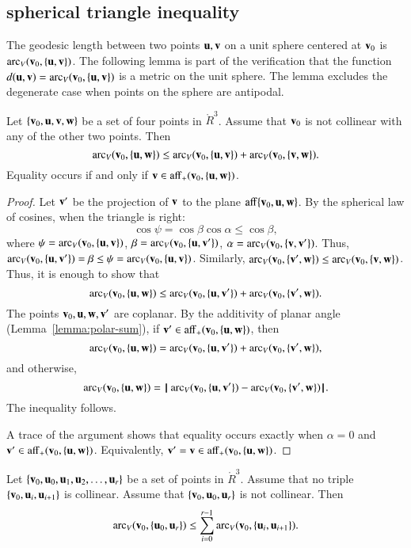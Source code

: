 \subsection{spherical triangle inequality}
%
%

The geodesic length between two points
$\u,\v$ on a unit sphere centered at $\v_0$ is $\arc_V(\v_0,\{\u,\v\})$.
The following lemma is part of the verification that
the function $d(\u,\v) = \arc_V(\v_0,\{\u,\v\})$ is a metric
on the unit sphere.  The lemma excludes the degenerate case when
points on the sphere are antipodal.
%

\begin{lemma}\label{lemma:sph-tri-ineq}
Let $\{\v_0,\u,\v,\w\}$ be a set of four points in $\ring{R}^3$.
Assume that $\v_0$ is not collinear with any of the other two points.
Then
   $$
   \arc_V(\v_0,\{\u,\w\}) \le \arc_V(\v_0,\{\u,\v\}) + \arc_V(\v_0,\{\v,\w\}).
   $$
Equality occurs if and only if $\v\in\op{aff}_+(\v_0,\{\u,\w\})$.
\end{lemma}

\begin{proof} Let $\v'$ be the projection of $\v$ to the plane
$\op{aff}\{\v_0,\u,\w\}$.  
By the spherical law of cosines, when the triangle is right:
   $$
   \cos\psi = \cos\beta\cos\alpha \le \cos\beta,
   $$
where $\psi = \arc_V(\v_0,\{\u,\v\})$, $\beta = \arc_V(\v_0,\{\u,\v'\})$, $\alpha=\arc_V(\v_0,\{\v,\v'\})$.
Thus, $\arc_V(\v_0,\{\u,\v'\})=\beta\le \psi=\arc_V(\v_0,\{\u,\v\})$.
Similarly, $\arc_V(\v_0,\{\v',\w\}) \le \arc_V(\v_0,\{\v,\w\})$.
Thus, it is enough to show that 
  $$
  \arc_V(\v_0,\{\u,\w\}) \le \arc_V(\v_0,\{\u,\v'\}) + \arc_V(\v_0,\{\v',\w\}).
  $$
The points $\v_0,\u,\w,\v'$ are coplanar.
By the additivity of planar angle (Lemma~\ref{lemma:polar-sum}), if 
$\v'\in \op{aff}_+(\v_0,\{\u,\w\})$, then
   $$
   \arc_V(\v_0,\{\u,\w\}) = \arc_V(\v_0,\{\u,\v'\}) + \arc_V(\v_0,\{\v',\w\}),   
   $$
and otherwise,
   $$
   \arc_V(\v_0,\{\u,\w\}) = \norm{\arc_V(\v_0,\{\u,\v'\}) }{ \arc_V(\v_0,\{\v',\w\})}.
   $$
The inequality follows.

A trace of the argument shows that equality occurs exactly when
$\alpha=0$ and $\v'\in \op{aff}_+(\v_0,\{\u,\w\})$.  Equivalently,
$\v'=\v\in\op{aff}_+(\v_0,\{\u,\w\})$.
\end{proof}

\begin{lemma}
\label{lemma:sph-tri-multi}
Let $\{\v_0,\u_0,\u_1,\u_2,\ldots,\u_r\}$ be a set of points in $\ring{R}^3$.
Assume that no triple $\{\v_0,\u_i,\u_{i+1}\}$ is collinear.  Assume
that $\{\v_0,\u_0,\u_r\}$ is not collinear.  Then
$$
  \arc_V(\v_0,\{\u_0,\u_r\}) \le \sum_{i=0}^{r-1} \arc_V(\v_0,\{\u_i,\u_{i+1}\}).
$$
\end{lemma}

